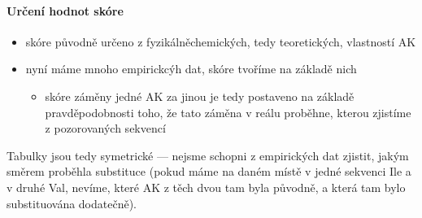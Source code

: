 \documentclass[DIV=8]{scrreprt}
\begin{document}
\paragraph{Určení hodnot skóre}
\begin{itemize}[nosep]
    \item skóre původně určeno z fyzikálněchemických, tedy teoretických, vlastností AK
    \item nyní máme mnoho empirickcýh dat, skóre tvoříme na základě nich
\begin{itemize}[nosep]
    \item skóre záměny jedné AK za jinou je tedy postaveno na základě pravděpodobnosti toho, že tato záměna v reálu proběhne, kterou zjistíme z pozorovaných sekvencí
\end{itemize}

\end{itemize}



Tabulky jsou tedy symetrické --- nejsme schopni z empirických dat zjistit, jakým směrem proběhla substituce (pokud máme na daném místě v jedné sekvenci Ile a v druhé Val, nevíme, které AK z těch dvou tam byla původně, a která tam bylo substituována dodatečně).
\end{document}
